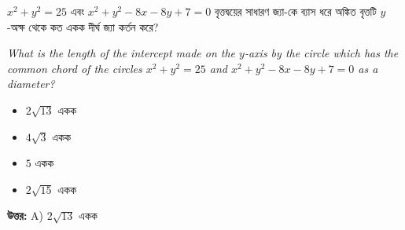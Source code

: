 \documentclass[12pt, a4paper]{article}
\begin{document}
\begin{tcolorbox}[questionbox={প্রশ্ন (Question) 5}]
    \noindent
    $x^2 + y^2 = 25$ এবং $x^2 + y^2 - 8x - 8y + 7 = 0$ বৃত্তদ্বয়ের সাধারণ জ্যা-কে ব্যাস ধরে অঙ্কিত বৃত্তটি $y$-অক্ষ থেকে কত একক দীর্ঘ জ্যা কর্তন করে?
    
    \vspace{0.8em}
    \begin{english}
    \noindent\textit{\color{darkgray}
    What is the length of the intercept made on the $y$-axis by the circle which has the common chord of the circles $x^2 + y^2 = 25$ and $x^2 + y^2 - 8x - 8y + 7 = 0$ as a diameter?
    }
    \end{english}
\end{tcolorbox}

\begin{itemize}[label={}, leftmargin=1cm, itemsep=0.5em]
    \item[\textbf{A)}] $2\sqrt{13}$ একক
    \item[\textbf{B)}] $4\sqrt{3}$ একক
    \item[\textbf{C)}] $5$ একক
    \item[\textbf{D)}] $2\sqrt{15}$ একক
\end{itemize}

\vspace{0.5em}
\begin{tcolorbox}[answerbox]
    \textbf{\color{success} উত্তর:} A) $2\sqrt{13}$ একক
\end{tcolorbox}
\vspace{1em}
\end{document}
